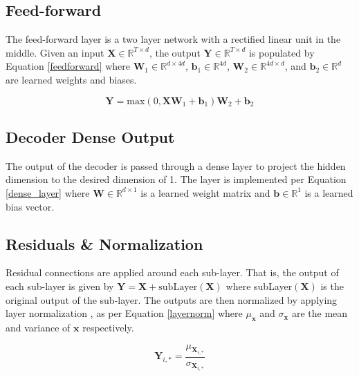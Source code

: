 \documentclass[conference]{IEEEtran}
\begin{document}
\subsection{Feed-forward}
The feed-forward layer is a two layer network with a rectified linear unit in the middle.
Given an input $\boldsymbol{X} \in \mathbb{R}^{T \times d}$, the output $\boldsymbol{Y} \in \mathbb{R}^{T \times d}$ is populated by Equation \ref{feedforward} where $\boldsymbol{W}_1 \in \mathbb{R}^{d \times 4d}$, $\boldsymbol{b}_1 \in \mathbb{R}^{4d}$, $\boldsymbol{W}_2 \in \mathbb{R}^{4d \times d}$, and $\boldsymbol{b}_2 \in \mathbb{R}^{d}$ are learned weights and biases.

\begin{equation} \label{feedforward}
\boldsymbol{Y} = \text{max}(0, \boldsymbol{X}  \boldsymbol{W}_1 + \boldsymbol{b}_1)  \boldsymbol{W}_2 + \boldsymbol{b}_2
\end{equation}

\subsection{Decoder Dense Output}
The output of the decoder is passed through a dense layer to project the hidden dimension to the desired dimension of 1.
The layer is implemented per Equation \ref{dense_layer} where $\boldsymbol{W} \in \mathbb{R}^{d \times 1}$ is a learned weight matrix and $\boldsymbol{b} \in \mathbb{R}^{1}$ is a learned bias vector.



\subsection{Residuals \& Normalization}
Residual connections \cite{He2015} are applied around each sub-layer.
That is, the output of each sub-layer is given by $\boldsymbol{Y} = \boldsymbol{X} + \text{subLayer}(\boldsymbol{X})$ where subLayer$(\boldsymbol{X})$ is the original output of the sub-layer.
The outputs are then normalized by applying layer normalization \cite{Ba2016}, as per Equation \ref{layernorm} where $\mu_{\boldsymbol{x}}$ and $\sigma_{\boldsymbol{x}}$ are the mean and variance of $\boldsymbol{x}$ respectively.

\begin{equation} \label{layernorm}
\boldsymbol{Y}_{i,*} = \frac{\mu_{\boldsymbol{X}_{i,*}}}{\sigma_{\boldsymbol{X}_{i,*}}}
\end{equation}
\end{document}
